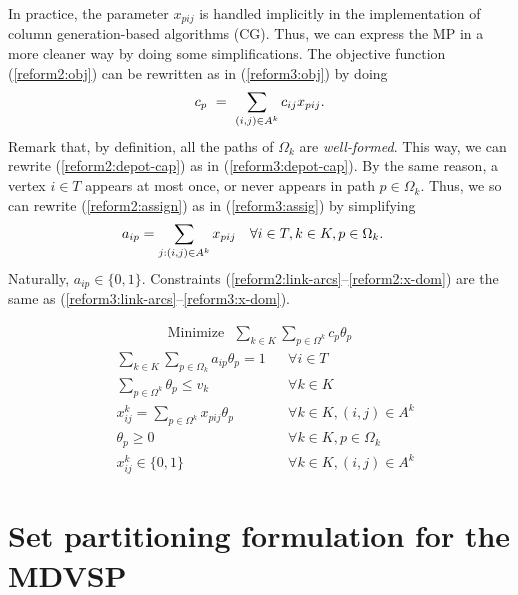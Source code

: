 \documentclass{article}
\begin{document}
In practice, the parameter $x_{pij}$ is handled implicitly in the implementation of column generation-based algorithms (CG). Thus, we can express the MP in a more cleaner way by doing some simplifications. The objective function (\ref{reform2:obj}) can be rewritten as in (\ref{reform3:obj}) by doing
\begin{align}
   c_p~=~\sum_{(i,j) \in A^k} c_{ij} x_{pij}. \notag
\end{align}
Remark that, by definition, all the paths of $\Omega_k$ are \textit{well-formed}. This way, %
we can rewrite (\ref{reform2:depot-cap}) as in (\ref{reform3:depot-cap}). By the same reason, a vertex $i \in T$ appears at most once, or never appears in path $p \in \Omega_k$. Thus, we so can rewrite (\ref{reform2:assign}) as in (\ref{reform3:assig}) by simplifying
\begin{align}
   & a_{ip} = \sum_{j:(i,j) \in A^k} x_{pij} & & \forall i \in T, k \in K, p \in \Omega_k. \notag
\end{align}
Naturally, $a_{ip} \in \{0,1\}$. Constraints (\ref{reform2:link-arcs}--\ref{reform2:x-dom}) are the same as (\ref{reform3:link-arcs}--\ref{reform3:x-dom}).

\noindent
\begin{minipage}{\linewidth}
\begin{align}
   \mathrm{Minimize~~~}\sum_{k \in K} \sum_{p \in \Omega^k} c_p \theta_p \label{reform3:obj}
\end{align}
\begin{align}
   & \sum_{k \in K} \sum_{p \in \Omega_k} a_{ip} \theta_p  = 1 & & \forall i \in T \label{reform3:assig}\\[4pt]
   & \sum_{p \in \Omega^k} \theta_p \leqslant v_k & & \forall k \in K \label{reform3:depot-cap}\\[6pt]
   & x^k_{ij} = \sum_{p \in \Omega^k} x_{pij} \theta_p & &  \forall k \in K, (i,j) \in A^k \label{reform3:link-arcs}\\
   & \theta_p \geqslant 0 & & \forall k \in K, p \in \Omega_k \label{reform3:path-dom}\\
   & x^k_{ij} \in \{0,1\} & & \forall k \in K, (i,j) \in A^k \label{reform3:x-dom}
\end{align}
\end{minipage}

\section{Set partitioning formulation for the MDVSP}
\end{document}
